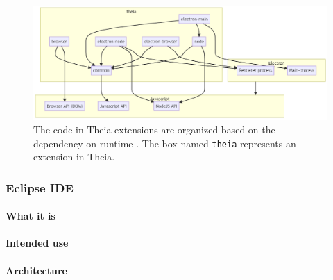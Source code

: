 \begin{figure}[htbp]  %
  \centering
  \includegraphics[width=\textwidth]{figures/theia-code-organization}
  \caption[Theia code organization]{The code in Theia extensions are organized based on the dependency on runtime . The box named \texttt{theia} represents an extension in Theia.~\cite{antonkosyakovCodeOrganization2019}}\label{fig:theia-organization}
\end{figure}


\subsubsection{Eclipse IDE}\label{sec:eclipse-ide}

\paragraph*{What it is}

\paragraph*{Intended use}

\paragraph*{Architecture}

